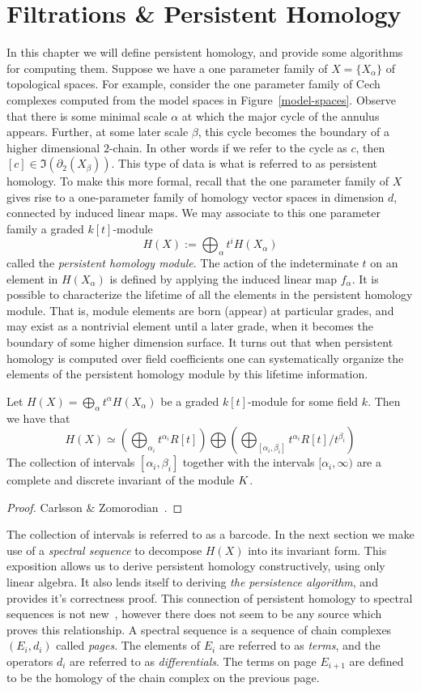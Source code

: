 \chapter{Filtrations \& Persistent Homology}
In this chapter we will define persistent homology, and provide some algorithms for computing them. Suppose we have a one parameter family of  $X = \{ X_\alpha \}$ of topological spaces. For example, consider the one parameter family of Cech complexes computed from the model spaces in Figure~\ref{model-spaces}. Observe that there is some minimal scale $\alpha$ at which the major cycle of the annulus appears. Further, at some later scale $\beta$, this cycle becomes the boundary of a higher dimensional $2$-chain. In other words if we refer to the cycle as $c$, then $[c] \in \Im(\partial_2(X_\beta))$. This type of data is what is referred to as persistent homology. To make this more formal, recall that the one parameter family of $X$ gives rise to a one-parameter family of homology vector spaces in dimension $d$, connected by induced linear maps. We may associate to this one parameter family a graded $k[t]$-module \[ H(X) := \bigoplus_\alpha t^i H(X_\alpha) \] called the \emph{persistent homology module}. The action of the indeterminate $t$ on an element in $H(X_\alpha)$ is defined by applying the induced linear map $f_\alpha$. It is possible to characterize the lifetime of all the elements in the persistent homology module. That is, module elements are born (appear) at particular grades, and may exist as a nontrivial element until a later grade, when it becomes the boundary of some higher dimension surface. It turns out that when persistent homology is computed over field coefficients one can systematically organize the elements of the persistent homology module by this lifetime information. 
\begin{theorem} Let $H(X) = \bigoplus_\alpha t^\alpha H(X_\alpha)$ be a graded $k[t]$-module for some field $k$. Then we have that 
\[ H(X) \simeq \left( \bigoplus_{\alpha_i}t^{\alpha_i}R[t] \right) \bigoplus \left( \bigoplus_{[\alpha_i, \beta_i]} t^{\alpha_i}R[t]/t^{\beta_i}  \right)  \]
The collection of intervals $[\alpha_i,\beta_i]$ together with the intervals $[\alpha_i, \infty)$ are a complete and discrete invariant 
of the module $K$. 
\end{theorem}
\begin{proof}
Carlsson \& Zomorodian~\cite{zc-cph-04}.
\end{proof}
The collection of intervals is referred to as a barcode. In the next section we make use of a \emph{spectral sequence} to decompose $H(X)$ into its invariant form. This exposition allows us to derive persistent homology constructively, using only linear algebra. It also lends itself to deriving \emph{the persistence algorithm}, and provides it's correctness proof. This connection of persistent homology to spectral sequences is not new~\cite{zc-cph-04}, however there does not seem to be any source which proves this relationship. A spectral sequence is a sequence of chain complexes $(E_i, d_i)$ called \emph{pages}. The elements of $E_i$ are referred to as \emph{terms}, and the operators $d_i$ are referred to as \emph{differentials}. The terms on page $E_{i+1}$ are defined to be the homology of the chain complex on the previous page.

